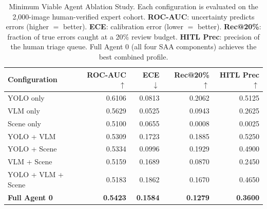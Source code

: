 \begin{table}[!htbp]
\centering
\caption{Minimum Viable Agent Ablation Study. Each configuration is evaluated on the 2,000-image human-verified expert cohort. \textbf{ROC-AUC}: uncertainty predicts errors (higher $=$ better). \textbf{ECE}: calibration error (lower $=$ better). \textbf{Rec@20\%}: fraction of true errors caught at a 20\% review budget. \textbf{HITL Prec}: precision of the human triage queue. Full Agent 0 (all four SAA components) achieves the best combined profile.}
\label{tab:ablation}
\begin{tabular}{lrrrr}
\toprule
Configuration & ROC-AUC $\uparrow$ & ECE $\downarrow$ & Rec@20\% $\uparrow$ & HITL Prec $\uparrow$ \\
\midrule
YOLO only & 0.6106 & 0.0813 & 0.2062 & 0.5125 \\
VLM only & 0.5629 & 0.0525 & 0.0943 & 0.2625 \\
Scene only & 0.5100 & 0.0655 & 0.0008 & 0.0025 \\
YOLO + VLM & 0.5309 & 0.1723 & 0.1885 & 0.5250 \\
YOLO + Scene & 0.5334 & 0.0996 & 0.1929 & 0.4900 \\
VLM + Scene & 0.5159 & 0.1689 & 0.0870 & 0.2450 \\
YOLO + VLM + Scene & 0.5183 & 0.1862 & 0.1670 & 0.4650 \\
\textbf{Full Agent 0} & \textbf{0.5423} & \textbf{0.1584} & \textbf{0.1279} & \textbf{0.3600} \\
\bottomrule
\end{tabular}
\end{table}